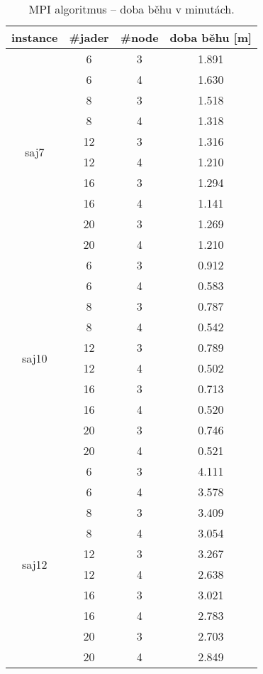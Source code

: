 \documentclass{article}
\begin{document}
    \begin{table}[h]
        \centering
        \begin{tabular}{|c|c|c|c|}
            \hline
            \textbf{instance} & \textbf{\#jader} & \textbf{\#node} & \multicolumn{1}{c|}{\textbf{doba běhu} {[}m{]}} \\ \hline
            \multirow{10}{*}{saj7}  & 6  & 3 & 1.891 \\
            & 6  & 4 & 1.630 \\
            & 8  & 3 & 1.518 \\
            & 8  & 4 & 1.318 \\
            & 12 & 3 & 1.316 \\
            & 12 & 4 & 1.210 \\
            & 16 & 3 & 1.294 \\
            & 16 & 4 & 1.141 \\
            & 20 & 3 & 1.269 \\
            & 20 & 4 & 1.210 \\ \hline
            \multirow{10}{*}{saj10} & 6  & 3 & 0.912 \\
            & 6  & 4 & 0.583 \\
            & 8  & 3 & 0.787 \\
            & 8  & 4 & 0.542 \\
            & 12 & 3 & 0.789 \\
            & 12 & 4 & 0.502 \\
            & 16 & 3 & 0.713 \\
            & 16 & 4 & 0.520 \\
            & 20 & 3 & 0.746 \\
            & 20 & 4 & 0.521 \\ \hline
            \multirow{10}{*}{saj12} & 6  & 3 & 4.111 \\
            & 6  & 4 & 3.578 \\
            & 8  & 3 & 3.409 \\
            & 8  & 4 & 3.054 \\
            & 12 & 3 & 3.267 \\
            & 12 & 4 & 2.638 \\
            & 16 & 3 & 3.021 \\
            & 16 & 4 & 2.783 \\
            & 20 & 3 & 2.703 \\
            & 20 & 4 & 2.849 \\ \hline
        \end{tabular}
        \caption{MPI algoritmus -- doba běhu v minutách.}
        \label{tab:mpi}
    \end{table}
\end{document}
